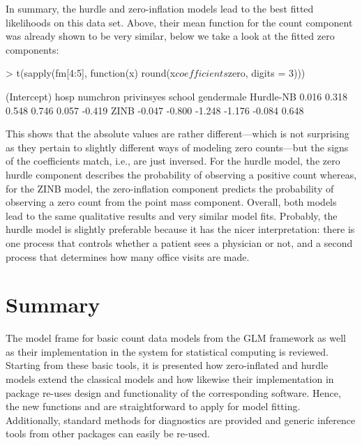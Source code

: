 \documentclass{Z}
\newcommand{\fct}[1]{\code{#1()}}
\begin{document}
In summary, the hurdle and zero-inflation models lead to the best 
fitted likelihoods on this data set. Above, their mean function for the
count component was already shown to be very similar, below we take a
look at the fitted zero components:
\begin{Schunk}
\begin{Sinput}
> t(sapply(fm[4:5], function(x) round(x$coefficients$zero, digits = 3)))
\end{Sinput}
\begin{Soutput}
          (Intercept)   hosp numchron privinsyes school gendermale
Hurdle-NB       0.016  0.318    0.548      0.746  0.057     -0.419
ZINB           -0.047 -0.800   -1.248     -1.176 -0.084      0.648
\end{Soutput}
\end{Schunk}
This shows that the absolute values are rather different---which is not
surprising as they pertain to slightly different ways of modeling zero
counts---but the signs of the coefficients match, i.e., are just inversed.
For the hurdle model, the zero hurdle component describes the probability
of observing a positive count whereas, for the ZINB model, the zero-inflation
component predicts the probability of observing a zero count from the
point mass component. Overall, both models lead to the same qualitative
results and very similar model fits. Probably, the hurdle model is slightly
preferable because it has the nicer interpretation: there is one process
that controls whether a patient sees a physician or not, and a second 
process that determines how many office visits are made.

\clearpage

\section{Summary} \label{sec:summary}

The model frame for basic count data models from the GLM framework as well
as their implementation in the  system for statistical computing
is reviewed. Starting from these basic tools, it is presented how
zero-inflated and hurdle models extend the classical models and how
likewise their  implementation in package  re-uses
design and functionality of the corresponding  software.
Hence, the new functions \fct{zeroinfl} and \fct{hurdle} are straightforward
to apply for model fitting. Additionally, standard methods for diagnostics 
are provided and generic inference tools from other packages can easily be
re-used.
\end{document}
